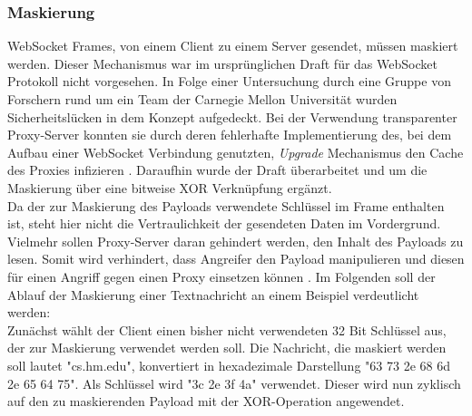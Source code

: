\documentclass[11pt,a4paper,titlepage]{scrartcl}
\numberwithin{equation}{section}
\begin{document}
\subsubsection*{Maskierung}\label{subsubsec:wsMasking}
WebSocket Frames, von einem Client zu einem Server gesendet, müssen maskiert werden. Dieser Mechanismus war im ursprünglichen Draft für das WebSocket Protokoll nicht vorgesehen. In Folge einer Untersuchung durch eine Gruppe von Forschern rund um ein Team der Carnegie Mellon Universität wurden Sicherheitslücken in dem Konzept aufgedeckt. Bei der Verwendung transparenter Proxy-Server konnten sie durch deren fehlerhafte Implementierung des, bei dem Aufbau einer WebSocket Verbindung genutzten, \textit{Upgrade} Mechanismus den Cache des Proxies infizieren \autocite{huang_talking_2011}. Daraufhin wurde der Draft überarbeitet und um die Maskierung über eine bitweise XOR Verknüpfung ergänzt. \\

\noindent Da der zur Maskierung des Payloads verwendete Schlüssel im Frame enthalten ist, steht hier nicht die Vertraulichkeit der gesendeten Daten im Vordergrund. Vielmehr sollen Proxy-Server daran gehindert werden, den Inhalt des Payloads zu lesen. Somit wird verhindert, dass Angreifer den Payload manipulieren und diesen für einen Angriff gegen einen Proxy einsetzen können \autocite{gorski_websockets_2015}.  Im Folgenden soll der Ablauf der Maskierung einer Textnachricht an einem Beispiel verdeutlicht werden:\\

\noindent Zunächst wählt der Client einen bisher nicht verwendeten 32 Bit Schlüssel aus, der zur Maskierung verwendet werden soll. Die Nachricht, die maskiert werden soll lautet "cs.hm.edu", konvertiert in hexadezimale Darstellung "63 73 2e 68 6d 2e 65 64 75". Als Schlüssel wird "3c 2e 3f 4a" verwendet. Dieser wird nun zyklisch auf den zu maskierenden Payload mit der XOR-Operation angewendet.\\
\end{document}
